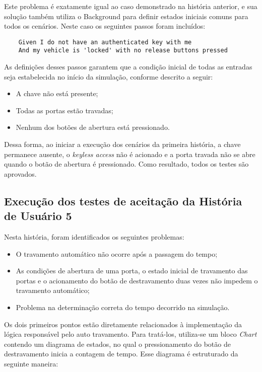 Este problema é exatamente igual ao caso demonstrado na história anterior, e sua solução também utiliza o Background para definir estados iniciais comuns para todos 
os cenários. Neste caso os seguintes passos foram incluídos:

\begin{verbatim}
	Given I do not have an authenticated key with me
	And my vehicle is 'locked' with no release buttons pressed
\end{verbatim}

As definições desses passos garantem que a condição inicial de todas as entradas seja estabelecida no início da simulação, conforme descrito a seguir:

\begin{itemize}
	\item A chave não está presente;
	\item Todas as portas estão travadas;
	\item Nenhum dos botões de abertura está pressionado.
\end{itemize}

Dessa forma, ao iniciar a execução dos cenários da primeira história, a chave permanece ausente, o \textit{keyless access} não é acionado e a porta travada não se 
abre quando o botão de abertura é pressionado. Como resultado, todos os testes são aprovados.


\subsection{Execução dos testes de aceitação da História de Usuário 5}

Nesta história, foram identificados os seguintes problemas:

\begin{itemize}
	\item O travamento automático não ocorre após a passagem do tempo;
	\item As condições de abertura de uma porta, o estado inicial de travamento das portas e o acionamento do botão de destravamento duas vezes não impedem o travamento automático;
	\item Problema na determinação correta do tempo decorrido na simulação.
\end{itemize}

Os dois primeiros pontos estão diretamente relacionados à implementação da lógica responsável pelo auto travamento. Para tratá-los, utiliza-se um bloco \textit{Chart} 
contendo um diagrama de estados, no qual o pressionamento do botão de destravamento inicia a contagem de tempo. Esse diagrama é estruturado da seguinte maneira:

